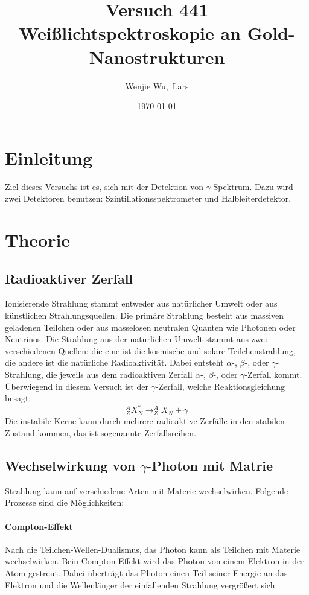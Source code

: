 \documentclass[ngerman,11pt]{article}
\title{Versuch 441 Weißlichtspektroskopie an Gold-Nanostrukturen}
\author{Wenjie Wu,~Lars }
\date{\today}
\begin{document}
	\maketitle
	\begin{abstract}

	\end{abstract}
	\begin{multicols}{2}
		\section{Einleitung}
		Ziel dieses Versuchs ist es, sich mit der Detektion von $\gamma$-Spektrum. Dazu wird zwei Detektoren benutzen: Szintillationsspektrometer und  Halbleiterdetektor.
		\section{Theorie}
		\subsection{Radioaktiver Zerfall}
		Ionisierende Strahlung stammt entweder aus natürlicher Umwelt oder aus künstlichen Strahlungsquellen. Die primäre Strahlung besteht aus massiven geladenen Teilchen oder aus masselosen neutralen Quanten wie Photonen oder Neutrinos. Die Strahlung aus der natürlichen Umwelt stammt aus zwei verschiedenen Quellen: die eine ist die kosmische und solare Teilchenstrahlung, die andere ist die natürliche Radioaktivität. Dabei entsteht $\alpha$-, $\beta$-, oder $\gamma$-Strahlung, die jeweils aus dem radioaktiven Zerfall $\alpha$-, $\beta$-, oder $\gamma$-Zerfall kommt. Überwiegend in diesem Versuch ist der $\gamma$-Zerfall, welche Reaktionsgleichung besagt:
		\[
		^A_ZX^*_N\rightarrow ^A_ZX_N+\gamma
		\] 
		Die instabile Kerne kann durch mehrere radioaktive Zerfälle in den stabilen Zustand kommen, das ist sogenannte Zerfallsreihen.
		\subsection{Wechselwirkung von $\gamma$-Photon mit Matrie}
		Strahlung kann auf verschiedene Arten mit Materie wechselwirken. Folgende Prozesse sind die M\"oglichkeiten:
		\paragraph{Compton-Effekt} 
		Nach die Teilchen-Wellen-Dualismus, das Photon kann als Teilchen mit Materie wechselwirken. Bein Compton-Effekt wird das Photon von einem Elektron in der Atom gestreut. Dabei \"ubertr\"agt das Photon einen Teil seiner Energie an das Elektron und die Wellenl\"anger der einfallenden Strahlung vergr\"o\ss ert sich.

\end{multicols}
\end{document}
